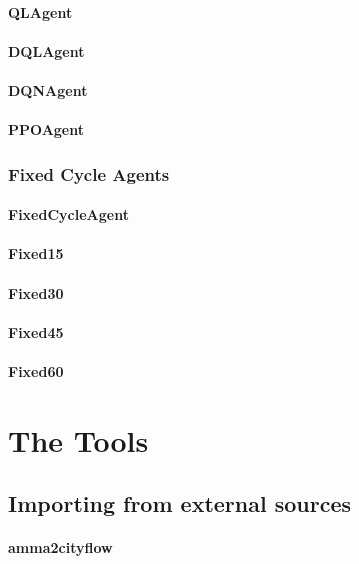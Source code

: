 \paragraph{QLAgent}
\paragraph{DQLAgent}
\paragraph{DQNAgent}
\paragraph{PPOAgent}

\subsubsection{Fixed Cycle Agents}

\paragraph{FixedCycleAgent}
\paragraph{Fixed15}
\paragraph{Fixed30}
\paragraph{Fixed45}
\paragraph{Fixed60}

\section{The Tools}

\subsection{Importing from external sources}

\paragraph{amma2cityflow}
